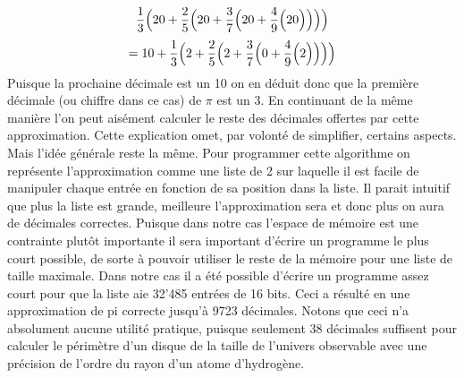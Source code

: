 \documentclass{article}
\begin{document}
$$
\frac{1}{3}\Bigl(20+\frac{2}{5}\Bigl(20+\frac{3}{7}\Bigl(20+\frac{4}{9}\Bigl(20\Bigr)\Bigr)\Bigr)\Bigr)
$$
$$
=10 + \frac{1}{3}\Bigl(2+\frac{2}{5}\Bigl(2+\frac{3}{7}\Bigl(0+\frac{4}{9}\Bigl(2\Bigr)\Bigr)\Bigr)\Bigr)
$$
Puisque la prochaine décimale est un 10 on en déduit donc que la première décimale (ou chiffre dans ce cas) de $\pi$ est un 3. En continuant de la même manière l'on peut aisément calculer le reste des décimales offertes par cette approximation. Cette explication omet, par volonté de simplifier, certains aspects. Mais l'idée générale reste la même. Pour programmer cette algorithme on représente l'approximation comme une liste de 2 sur laquelle il est facile de manipuler chaque entrée en fonction de sa position dans la liste. Il parait intuitif que plus la liste est grande, meilleure l'approximation sera et donc plus on aura de décimales correctes. Puisque dans notre cas l'espace de mémoire est une contrainte plutôt importante il sera important d'écrire un programme le plus court possible, de sorte à pouvoir utiliser le reste de la mémoire pour une liste de taille maximale. Dans notre cas il a été possible d'écrire un programme assez court pour que la liste aie 32'485 entrées de 16 bits. Ceci a résulté en une approximation de pi correcte jusqu'à 9723 décimales. Notons que ceci n'a absolument aucune utilité pratique, puisque seulement 38 décimales suffisent pour calculer le périmètre d'un disque de la taille de l'univers observable avec une précision de l'ordre du rayon d'un atome d'hydrogène. \cite{yates_2024}
\newpage
\printbibliography
\end{document}
